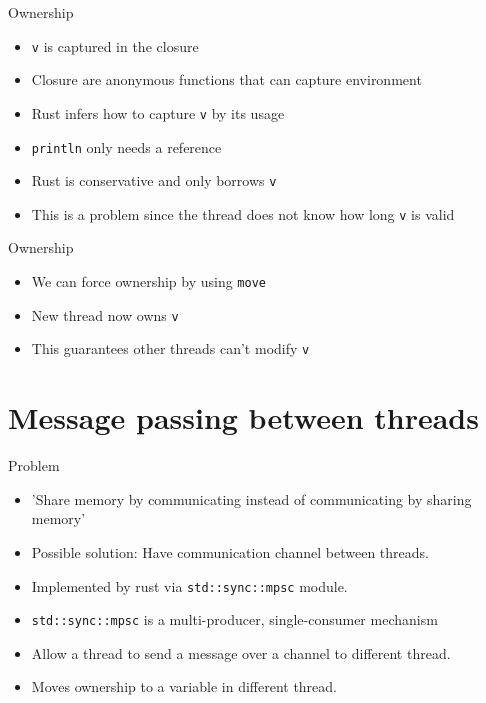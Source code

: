 \documentclass{beamer}
\begin{document}
\begin{frame}{Ownership}
    \begin{itemize}
        \item \texttt{v} is captured in the closure
        \item Closure are anonymous functions that can capture environment
        \item Rust infers how to capture \texttt{v} by its usage
        \item \texttt{println} only needs a reference
        \item Rust is conservative and only borrows \texttt{v}
        \item This is a problem since the thread does not know how long
        \texttt{v} is valid
    \end{itemize}
\end{frame}

\begin{frame}{Ownership}
    \begin{itemize}
        \item We can force ownership by using \texttt{move}
        \item New thread now owns \texttt{v}
        \item This guarantees other threads can't modify \texttt{v}
    \end{itemize}
\end{frame}

\section{Message passing between threads}
\begin{frame}{Problem}
    \begin{itemize}
        \item 'Share memory by communicating instead of communicating by sharing memory'
        \item Possible solution: Have communication channel between threads.
        \item Implemented by rust via \texttt{std::sync::mpsc} module.
        \item \texttt{std::sync::mpsc} is a multi-producer, single-consumer mechanism
        \item Allow a thread to send a message over a channel to different thread.
        \item Moves ownership to a variable in different thread.
    \end{itemize}
\end{frame}
\end{document}
